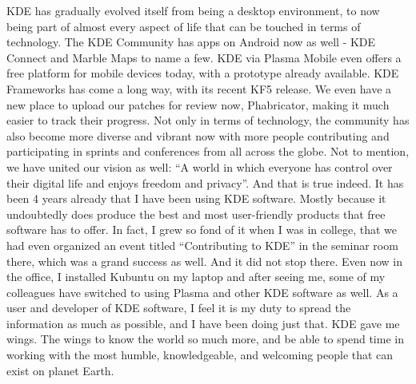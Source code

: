 KDE has gradually evolved itself from being a desktop environment, to now being part of almost every aspect of life that can be touched in terms of technology. The KDE Community has apps on Android now as well - KDE Connect and Marble Maps to name a few. KDE via Plasma Mobile even offers a free platform for mobile devices today, with a prototype already available. KDE Frameworks has come a long way, with its recent KF5 release. We even have a new place to upload our patches for review now, Phabricator, making it much easier to track their progress.  Not only in terms of technology, the community has also become more diverse and vibrant now with more people contributing and participating in sprints and conferences from all across the globe. Not to mention, we have united our vision as well: “A world in which everyone has control over their digital life and enjoys freedom and privacy”. And that is true indeed. It has been 4 years already that I have been using KDE software. Mostly because it undoubtedly does produce the best and most user-friendly products that free software has to offer. In fact, I grew so fond of it when I was in college, that we had even organized an event titled “Contributing to KDE” in the seminar room there, which was a grand success as well. And it did not stop there. Even now in the office, I installed Kubuntu on my laptop and after seeing me, some of my colleagues have switched to using Plasma and other KDE software as well. As a user and developer of KDE software, I feel it is my duty to spread the information as much as possible, and I have been doing just that. KDE gave me wings. The wings to know the world so much more, and be able to spend time in working with the most humble, knowledgeable, and welcoming people that can exist on planet Earth. 

